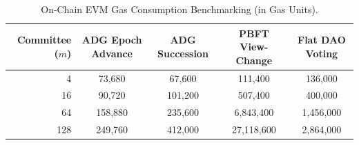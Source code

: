 \begin{table}[h]
\centering
\small
\caption{On-Chain EVM Gas Consumption Benchmarking (in Gas Units).}
\label{tab:gas_comparison}
\begin{tabular}{rcccc}
\hline\hline
Committee ($m$) & ADG Epoch Advance & ADG Succession & PBFT View-Change & Flat DAO Voting \\ \hline
4 & 73,680 & 67,600 & 111,400 & 136,000 \\
16 & 90,720 & 101,200 & 507,400 & 400,000 \\
64 & 158,880 & 235,600 & 6,843,400 & 1,456,000 \\
128 & 249,760 & 412,000 & 27,118,600 & 2,864,000 \\
\hline\hline
\end{tabular}
\end{table}
